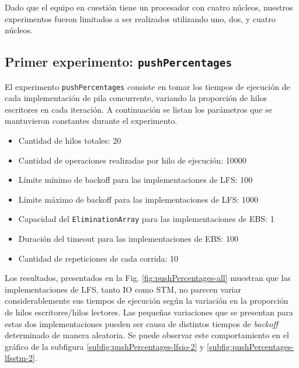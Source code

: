 Dado que el equipo en cuestión tiene un procesador con cuatro núcleos, nuestros experimentos fueron limitados a ser realizados utilizando uno, dos, y cuatro núcleos.

\subsection{Primer experimento: \texttt{pushPercentages}}\label{subsec:pushPercentages}
El experimento \texttt{pushPercentages} consiste en tomar los tiempos de ejecución de cada implementación de pila concurrente, variando la proporción de hilos escritores en cada iteración.
A continuación se listan los parámetros que se mantuvieron constantes durante el experimento.

\begin{itemize}
    \item Cantidad de hilos totales: 20
    \item Cantidad de operaciones realizadas por hilo de ejecución: 10000
    \item Límite mínimo de backoff para las implementaciones de LFS: 100
    \item Límite máximo de backoff para las implementaciones de LFS: 1000
    \item Capacidad del \texttt{EliminationArray} para las implementaciones de EBS: 1
    \item Duración del timeout para las implementaciones de EBS: 100
    \item Cantidad de repeticiones de cada corrida: 10
\end{itemize}

Los resultados, presentados en la Fig. \ref{fig:pushPercentages-all} muestran que las implementaciones de LFS, tanto IO como STM, no parecen variar considerablemente sus tiempos de ejecución según la variación en la proporción de hilos escritores/hilos lectores.
Las pequeñas variaciones que se presentan para estas dos implementaciones pueden ser causa de distintos tiempos de \emph{backoff} determinado de manera aleatoria. Se puede observar este comportamiento en el gráfico de la subfigura \ref{subfig:pushPercentages-lfsio-2} y \ref{subfig:pushPercentages-lfsstm-2}.


